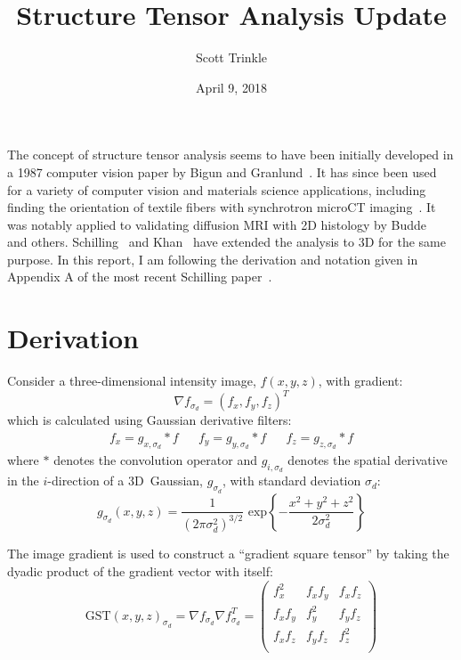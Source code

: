\documentclass[11pt]{article}
\title{Structure Tensor Analysis Update}
\author{Scott Trinkle}
\date{April 9, 2018}
\begin{document}
\maketitle

The concept of structure tensor analysis seems to have been initially developed
in a 1987 computer vision paper by Bigun and Granlund~\cite{Bigun1987}. It has
since been used for a variety of computer vision and materials science
applications, including finding the orientation of textile fibers with
synchrotron microCT imaging~\cite{Straumit2015}. It was notably applied to
validating diffusion MRI with 2D histology by Budde~\cite{Budde2012,Budde2013}
and others. Schilling~\cite{Schilling2016,Schilling2018} and
Khan~\cite{Khan2015} have extended the analysis to 3D for the same purpose. In
this report, I am following the derivation and notation given in Appendix A of
the most recent Schilling paper~\cite{Schilling2018}.

\section{Derivation}

Consider a three-dimensional intensity image, $f(x,y,z)$, with gradient:
\begin{equation}
  \label{eq:grad}
  \nabla f_{\sigma_d} = {\left(f_x, f_y, f_z\right)}^T
\end{equation}
which is calculated using Gaussian derivative filters:
\begin{align}
  \label{eq:gradcomps}
  f_x = g_{x,\sigma_d} \ast f & &  f_y = g_{y,\sigma_d} \ast f & &  f_z = g_{z,\sigma_d} \ast f
\end{align}
where $\ast$ denotes the convolution operator and $g_{i, \sigma_d}$ denotes the
spatial derivative in the $i$-direction of a 3D~Gaussian, $g_{\sigma_d}$, with
standard deviation $\sigma_d$:
\begin{equation}
  \label{eq:gauss}
  g_{\sigma_d}(x,y,z) = \frac{1}{\left(2\pi\sigma_d^2\right)^{3/2}}\text{ exp}\left\{-\frac{x^2 + y^2 + z^2}{2\sigma_d^2}\right\}
\end{equation}

The image gradient is used to construct a ``gradient square tensor'' by taking
the dyadic product of the gradient vector with itself:
\begin{equation}
  \label{eq:GST}
  \text{GST}(x, y, z)_{\sigma_d} = \nabla f_{\sigma_d} \nabla f_{\sigma_d}^T =
  \begin{pmatrix}
    f_x^2 & f_x f_y & f_x f_z \\
    f_x f_y & f_y^2 & f_y f_z \\
    f_x f_z & f_y f_z & f_z^2 \\
  \end{pmatrix}
\end{equation}
\end{document}
